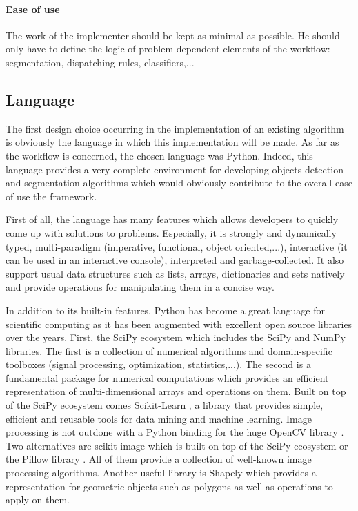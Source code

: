 \paragraph{Ease of use} The work of the implementer should be kept as minimal as possible. He should only have to define the logic of problem dependent elements of the workflow: segmentation, dispatching rules, classifiers,... 

\subsection{Language}
The first design choice occurring in the implementation of an existing algorithm is obviously the language in which this implementation will be made. As far as the workflow is concerned, the chosen language was Python. Indeed, this language provides a very complete environment for developing objects detection and segmentation algorithms which would obviously contribute to the overall ease of use the framework. 

First of all, the language has many features which allows developers to quickly come up with solutions to problems. Especially, it is strongly and dynamically typed, multi-paradigm (imperative, functional, object oriented,...), interactive (it can be used in an interactive console), interpreted and garbage-collected. It also support usual data structures such as lists, arrays, dictionaries and sets natively and provide operations for manipulating them in a concise way. 

In addition to its built-in features, Python has become a great language for scientific computing as it has been augmented with excellent open source libraries over the years. First, the SciPy ecosystem which includes the SciPy \cite{oliphant:2007} and NumPy \cite{vanderwalt:2011} libraries. The first is a collection of numerical algorithms and domain-specific toolboxes (signal processing, optimization, statistics,...). The second is a fundamental package for numerical computations which provides an efficient representation of multi-dimensional arrays and operations on them. Built on top of the SciPy ecosystem comes Scikit-Learn \cite{pedregosa:2011}, a library that provides simple, efficient and reusable tools for data mining and machine learning. Image processing is not outdone with a Python binding for the huge OpenCV library \cite{opencv_library}. Two alternatives are scikit-image \cite{scikit-image} which is built on top of the SciPy ecosystem or the Pillow library \cite{pillow}. All of them provide a collection of well-known image processing algorithms. Another useful library is Shapely \cite{shapely} which provides a representation for geometric objects such as polygons as well as operations to apply on them. 

